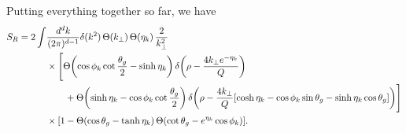 \documentclass[11pt,twoside,reqno]{amsart}
\theoremstyle{plain}
\theoremstyle{remark}
\theoremstyle{definition}
\theoremstyle{remark}
\theoremstyle{definition}
\theoremstyle{definition}
\begin{document}
	Putting everything together so far, we have
	\begin{equation}
	\begin{aligned}
		S_R = 2 \int &\frac{d^d k}{(2\pi)^{d-1}} \delta(k^2)\,\Theta(k_\perp) \,\Theta(\eta_k)\,\frac{2}{k_\perp^2} \\
			&\times \Bigg[ \Theta\qty(\cos\phi_k\cot\frac{\theta_g}{2} - \sinh\eta_k)\,\delta\qty(\rho - \frac{4 k_\perp e^{-\eta_k}}{Q}) \\
			&\qquad+ \Theta\qty(\sinh\eta_k - \cos\phi_k\cot\frac{\theta_g}{2})\, \delta\qty(\rho - \frac{4 k_\perp}{Q}\qty[\cosh\eta_k - \cos\phi_k\sin\theta_g - \sinh\eta_k\cos\theta_g])\Bigg] \\
			&\times \qty[1 - \Theta(\cos\theta_g - \tanh\eta_k)\,\Theta\qty(\cot\theta_g - e^{\eta_k}\cos\phi_k)].
	\end{aligned}
	\end{equation}
\end{document}
